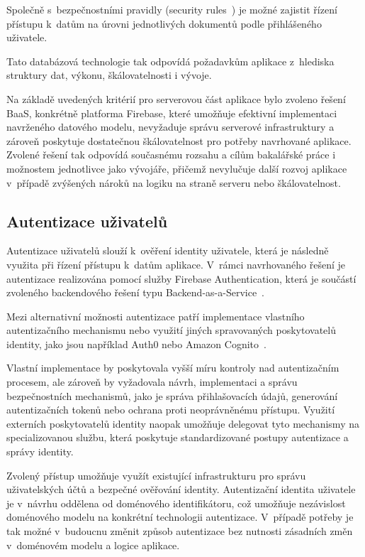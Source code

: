 Společně s~bezpečnostními pravidly (security rules~\parencite{firebase_security_rules}) je možné zajistit řízení přístupu k~datům na úrovni jednotlivých dokumentů podle přihlášeného uživatele.

Tato databázová technologie tak odpovídá požadavkům aplikace z~hlediska struktury dat, výkonu, škálovatelnosti i vývoje.

Na základě uvedených kritérií pro serverovou část aplikace bylo zvoleno řešení BaaS, konkrétně platforma Firebase, které umožňuje efektivní implementaci navrženého datového modelu, nevyžaduje správu serverové infrastruktury a zároveň poskytuje dostatečnou škálovatelnost pro potřeby navrhované aplikace.
Zvolené řešení tak odpovídá současnému rozsahu a cílům bakalářské práce i možnostem jednotlivce jako vývojáře, přičemž nevylučuje další rozvoj aplikace v~případě zvýšených nároků na logiku na straně serveru nebo škálovatelnost.

\subsection{Autentizace uživatelů}
Autentizace uživatelů slouží k~ověření identity uživatele, která je následně využita při řízení přístupu k~datům aplikace.
V~rámci navrhovaného řešení je autentizace realizována pomocí služby Firebase Authentication, která je součástí zvoleného backendového řešení typu Backend-as-a-Service~\parencite{firebase_overview}.

Mezi alternativní možnosti autentizace patří implementace vlastního autentizačního mechanismu nebo využití jiných spravovaných poskytovatelů identity, jako jsou například Auth0 nebo Amazon Cognito~\parencite{auth0_docs, cognito_docs}.

Vlastní implementace by poskytovala vyšší míru kontroly nad autentizačním procesem, ale zároveň by vyžadovala návrh, implementaci a správu bezpečnostních mechanismů, jako je správa přihlašovacích údajů, generování autentizačních tokenů nebo ochrana proti neoprávněnému přístupu.
Využití externích poskytovatelů identity naopak umožňuje delegovat tyto mechanismy na specializovanou službu, která poskytuje standardizované postupy autentizace a správy identity.

Zvolený přístup umožňuje využít existující infrastrukturu pro správu uživatelských účtů a bezpečné ověřování identity.
Autentizační identita uživatele je v~návrhu oddělena od doménového identifikátoru, což umožňuje nezávislost doménového modelu na konkrétní technologii autentizace.
V~případě potřeby je tak možné v~budoucnu změnit způsob autentizace bez nutnosti zásadních změn v~doménovém modelu a logice aplikace.


